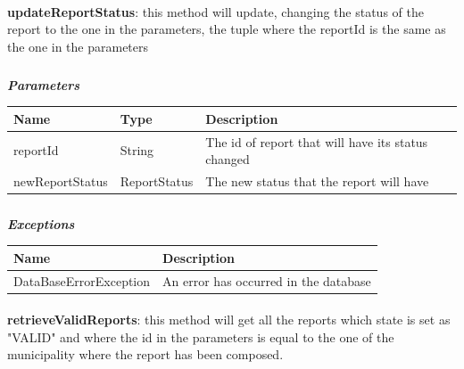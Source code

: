 					\clearpage	
					\paragraph{}
							\textbf{updateReportStatus}: this method will update, changing the status of the report to the one in the parameters, the tuple where the reportId is the same as the one in the parameters
							\subparagraph{}
							\textit{\textbf{Parameters}}
							\vspace{-2mm}
								\begin{table}[!h]
									\begin{tabular}{L{0.22\textwidth}L{0.22\textwidth}L{0.4\textwidth}}
										\toprule
										\textbf{Name} & \textbf{Type} & \textbf{Description} \\
										\midrule
								  		reportId & String & The id of report that will have its status changed \\
								  		newReportStatus & ReportStatus & The new status that the report will have \\
								 		\bottomrule
									\end{tabular}
								\end{table}
							\vspace{-6mm}
							\subparagraph{}
								\textit{\textbf{Exceptions}}
								\vspace{-2mm}
									\begin{table}[!h]
									\begin{tabular}{ll}
										\toprule
										\textbf{Name} & \textbf{Description} \\
										\midrule
								  		DataBaseErrorException & An error has occurred in the database \\
								 		\bottomrule
									\end{tabular}
								\end{table}
						
					\paragraph{}
							\textbf{retrieveValidReports}: this method will get all the reports which state is set as "VALID" and where the id in the parameters is equal to the one of the municipality where the report has been composed.
							
